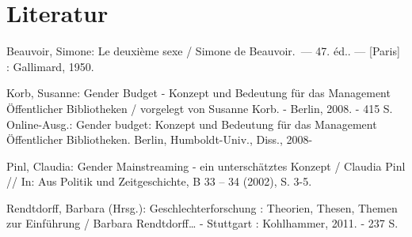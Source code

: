 \documentclass[a4paper,
fontsize=11pt,
oneside,
numbers=noperiodatend,
parskip=half-,
bibliography=totoc,
final
]{scrartcl}
\begin{document}
\section*{Literatur}\label{literatur}

Beauvoir, Simone: Le deuxième sexe / Simone de Beauvoir.~--- 47. éd..
--- {[}Paris{]} : Gallimard, 1950.

Korb, Susanne: Gender Budget - Konzept und Bedeutung für das Management
Öffentlicher Bibliotheken / vorgelegt von Susanne Korb. - Berlin, 2008.
- 415 S. Online-Ausg.: Gender budget: Konzept und Bedeutung für das
Management Öffentlicher Bibliotheken. Berlin, Humboldt-Univ., Diss.,
2008-

Pinl, Claudia: Gender Mainstreaming - ein unterschätztes Konzept /
Claudia Pinl // In: Aus Politik und Zeitgeschichte, B 33 -- 34 (2002),
S. 3-5.

Rendtdorff, Barbara (Hrsg.): Geschlechterforschung : Theorien, Thesen,
Themen zur Einführung / Barbara Rendtdorff\ldots{} - Stuttgart :
Kohlhammer, 2011. - 237 S.

\end{document}
